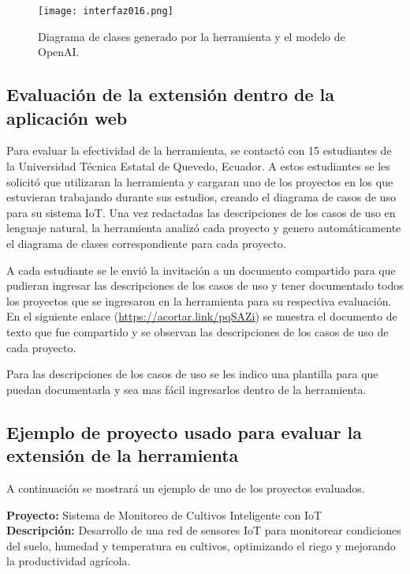  \begin{figure}[H]  
	\centering
	\texttt{[image: interfaz016.png]} 
	\caption{Diagrama de clases generado por la herramienta y el modelo de OpenAI.}
	\label{fig:cap3_interfaz_016}
\end{figure}

\subsection{Evaluación de la extensión dentro de la aplicación web}

Para evaluar la efectividad de la herramienta, se contactó con 15 estudiantes de la Universidad Técnica Estatal de Quevedo, Ecuador. A estos estudiantes se les solicitó que utilizaran la herramienta y cargaran uno de los proyectos en los que estuvieran trabajando durante sus estudios, creando el diagrama de casos de uso para su sistema IoT. Una vez redactadas las descripciones de los casos de uso en lenguaje natural, la herramienta analizó cada proyecto y genero automáticamente el diagrama de clases correspondiente para cada proyecto.

A cada estudiante se le envió la invitación a un documento compartido para que pudieran ingresar las descripciones de los casos de uso y tener documentado todos los proyectos que se ingresaron en la herramienta para su respectiva evaluación. En el siguiente enlace (\url{https://acortar.link/pqSAZi}) se muestra el documento de texto que fue compartido y se observan las descripciones de los casos de uso de cada proyecto.

Para las descripciones de los casos de uso se les indico una plantilla para que puedan documentarla y sea mas fácil ingresarlos dentro de la herramienta. 

\subsection{Ejemplo de proyecto usado para evaluar la extensión de la herramienta}

A continuación se mostrará un ejemplo de uno de los proyectos evaluados.

\textbf{Proyecto: } Sistema de Monitoreo de Cultivos Inteligente con IoT \\
\textbf{Descripción: } Desarrollo de una red de sensores IoT para monitorear condiciones del suelo, humedad y temperatura en cultivos, optimizando el riego y mejorando la productividad agrícola. 

